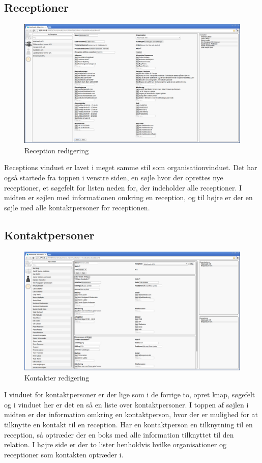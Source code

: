 \subsection{Receptioner}
\begin{figure}[ht!]
\centering
\includegraphics[width=\textwidth]{images/screen_rec.png}
\caption{Reception redigering}
\label{fig:screenrec}
\end{figure}
Receptions vinduet er lavet i meget samme stil som organisationvinduet. Det har også startede fra toppen i venstre siden, en søjle hvor der oprettes nye receptioner, et søgefelt for listen neden for, der indeholder alle receptioner. I midten er søjlen med informationen omkring en reception, og til højre er der en søjle med alle kontaktpersoner for receptionen.

\subsection{Kontaktpersoner}
\begin{figure}[ht!]
\centering
\includegraphics[width=\textwidth]{images/screen_con.png}
\caption{Kontakter redigering}
\label{fig:screencon}
\end{figure}
I vinduet for kontaktpersoner er der lige som i de forrige to, opret knap, søgefelt og i vinduet her er det en så en liste over kontaktpersoner. I toppen af søjlen i midten er der information omkring en kontaktperson, hvor der er mulighed for at tilknytte en kontakt til en reception. Har en kontaktperson en tilknytning til en reception, så optræder der en boks med alle information tilknyttet til den relation. I højre side er der to lister henholdvis hvilke organisationer og receptioner som kontakten optræder i.

